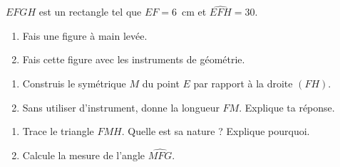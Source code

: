\begin{myenumerate}
\item $EFGH$ est un rectangle tel que $EF=6$~cm et $\widehat{EFH}=30$\degres.
\begin{enumerate}
\item Fais une figure à main levée.
\item Fais cette figure avec les instruments de géométrie.
\end{enumerate}
\item
\begin{enumerate}
\item Construis le symétrique $M$ du point $E$ par rapport à la droite
  $(FH)$.
\item Sans utiliser d'instrument, donne la longueur $FM$. Explique ta
  réponse.
\end{enumerate}
\item
\begin{enumerate}
\item Trace le triangle $FMH$. Quelle est sa nature ? Explique
  pourquoi.
\item Calcule la mesure de l'angle $\widehat{MFG}$.
\end{enumerate}
\end{myenumerate}
